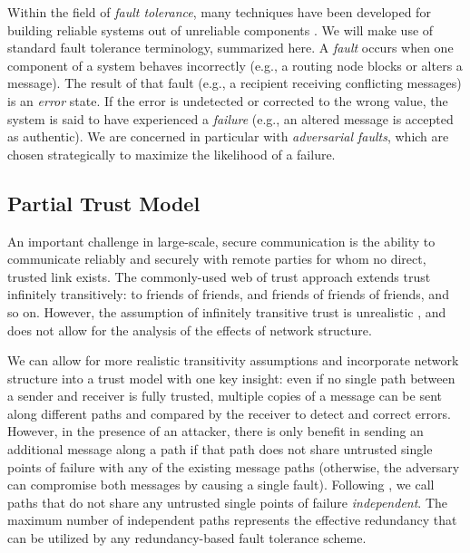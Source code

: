 \documentclass{sig-alternate-05-2015}
\begin{document}
Within the field of {\em fault tolerance},
many techniques have been developed for building reliable systems
out of unreliable components
\cite{avizienis_basic_2004, von_neumann_probabilistic_1956}.
We will make use of standard fault tolerance terminology, summarized here.
A {\em fault} occurs when one component
of a system behaves incorrectly (e.g., a routing node blocks or
alters a message).
The result of that fault (e.g., a recipient receiving conflicting messages)
is an {\em error} state.
If the error is undetected or corrected to the wrong value, the system is
said to have experienced a {\em failure} (e.g., an altered message is
accepted as authentic).
We are concerned in particular with {\em adversarial faults},
which are chosen strategically to maximize the likelihood of a failure.

\subsection{Partial Trust Model}

An important challenge in large-scale, secure communication is the ability to
communicate reliably and securely with remote parties for whom no direct,
trusted link exists.
The commonly-used web of trust approach
\cite{zimmermann_official_1995,ferguson_practical_2003}
extends trust infinitely transitively:
to friends of friends, and friends of friends of friends, and so on.
However, the assumption of infinitely transitive trust is unrealistic
\cite{christianson_why_1997},
and does not allow for the analysis of the effects of network structure.

We can allow for more realistic transitivity assumptions and incorporate
network structure into a trust model with one key insight:
even if no single path between a sender and receiver is fully trusted,
multiple copies of a message can be sent along different paths and compared
by the receiver to detect and correct errors.
However, in the presence of an attacker, there is only benefit in sending an
additional message along a path if that path does not share untrusted
single points of failure with any of the existing message paths
(otherwise, the adversary can compromise both messages
by causing a single fault).
Following \cite{reiter_resilient_1998},
we call paths that do not share any untrusted single points of failure
{\em independent}.
The maximum number of independent paths represents the effective redundancy that
can be utilized by any redundancy-based fault tolerance scheme.
\end{document}
